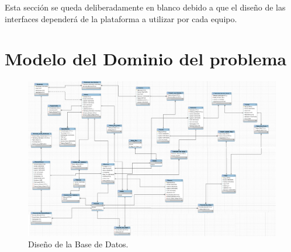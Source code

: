 \documentclass[oneside,10pt]{book}
\begin{document}
{\color{UCInterfaceColor} 
	Esta sección se queda deliberadamente en blanco debido a que el diseño de las interfaces dependerá de la plataforma a utilizar por cada equipo.\\	
}



\chapter{Modelo del Dominio del problema}

	\begin{figure}[htbp!]
		\centering
			\includegraphics[width=1.2\textwidth]{images/baseDeDatos}
		\caption{Diseño de la Base de Datos.}
	\end{figure}
	
\end{document}
